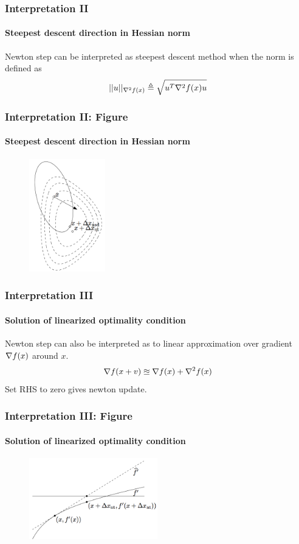 \documentclass{beamer}
\newcommand{\be}{\begin{eqnarray}}
\newcommand{\ee}{\end{eqnarray}}
\begin{document}
\begin{frame}
\frametitle{Interpretation II}
\framesubtitle{Steepest descent direction in Hessian norm}
    Newton step can be interpreted as 
    steepest descent method when the norm is defined as
    \be
    || u ||_{\fhess} \triangleq \sqrt{u^T \fhess u}
    \ee
\end{frame}

\begin{frame}
\frametitle{Interpretation II: Figure}
\framesubtitle{Steepest descent direction in Hessian norm}
\begin{figure}
\includegraphics[width=1.3in]{figure/steepest.png}
\caption{}
\end{figure}
\end{frame}

\begin{frame}
\frametitle{Interpretation III}
\framesubtitle{Solution of linearized optimality condition}
    Newton step can also be interpreted as 
    to linear approximation over gradient $\nabla f(x)$ around $x$.
    \be
        \nabla f(x+v) \approxeq \fgrad + \fhess
    \ee
    Set RHS to zero gives newton update.
\end{frame}

\begin{frame}
\frametitle{Interpretation III: Figure}
\framesubtitle{Solution of linearized optimality condition}
\begin{figure}
\includegraphics[width=2.2in]{figure/linear.png}
\caption{}
\end{figure}
\end{frame}

%
\end{document}
